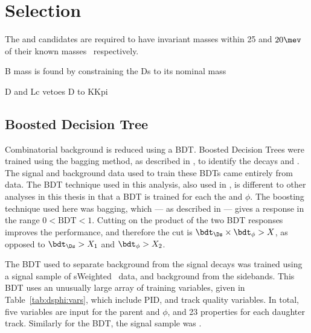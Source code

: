 \section{Selection}

%
%
%
%
%
%






The \decay{\Ds}{\kkpi} and \decay{\phi}{\kk} candidates are required to have invariant masses
within 25 and $20\mev$ of their known masses~\cite{PDG2012} respectively.

B mass is found by constraining the Ds to its nominal mass

D and Lc vetoes
D to KKpi



\subsection{Boosted Decision Tree}
Combinatorial background is reduced using a BDT.
Boosted Decision Trees were trained using the bagging method, as described in , to
identify the decays \decay{\Ds}{\kkpi} and \decay{\phi}{\kk}.
The signal and background data used to train these BDTs came entirely from data.
The BDT technique used in this analysis, also used in , is different to
other analyses in this thesis in that a BDT is trained for each the \Ds and $\phi$.
The boosting technique used here was bagging, which --- as described in  --- gives
a response in the range $0<\mathrm{BDT}<1$.
Cutting on the product of the two BDT responses improves the performance, and therefore the cut is
$\bdt_{\Ds}\times\bdt_\phi>X$, as opposed to $\bdt_{\Ds}>X_1$ and $\bdt_\phi>X_2$.

The BDT used to separate background from the signal \decay{\Ds}{\kkpi} decays was trained using
a signal sample of \decay{\Bs}{\Dsm\pip} sWeighted~\cite{splot} data, and background from the \Dsm
sidebands.
This BDT uses an unusually large array of training variables, given in Table~\ref{tab:dsphi:vars},
which include PID, and track quality variables.
In total, five variables are input for the parent \Ds and $\phi$, and 23 properties for each
daughter track.
Similarly for the \decay{\phi}{\kk} BDT, the signal sample was \decay{\Bs}{\jpsi\phi}.


